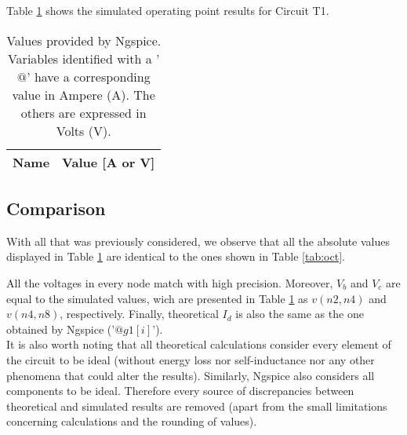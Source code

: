 Table \ref{tab:op} shows the simulated operating point results for Circuit T1.



\begin{table}[h]
	\centering
	\begin{tabular}{|l|r|}
		\hline    
		{\bf Name} & {\bf Value [A or V]} \\ \hline
    		
	\end{tabular}
	
	\caption{Values provided by Ngspice. Variables identified with a '$@$' have a
  	corresponding value in Ampere (A). The others are expressed in Volts (V).}
    
\label{tab:op}
\end{table}




\subsection{Comparison}

With all that was previously considered, we observe that all the absolute values displayed
in Table \ref{tab:op} are identical to the ones shown in Table \ref{tab:oct}.

All the voltages in every node match with high precision. Moreover, $V_b$ and $V_c$ are
equal to the simulated values, wich are presented in Table \ref{tab:op} as $v(n2,n4)$ and
$v(n4,n8)$, respectively. Finally, theoretical $I_d$ is also the same as the one obtained
by Ngspice ('$@g1[i]$'). \\


It is also worth noting that all theoretical calculations consider every element of the
circuit to be ideal (without energy loss nor self-inductance nor any other phenomena that could
alter the results). Similarly, Ngspice also considers all components to be ideal. Therefore
every source of discrepancies between theoretical and simulated results are removed (apart from
the small limitations concerning calculations and the rounding of values).



